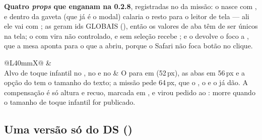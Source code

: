 \begin{atencao}
\textbf{Quatro \emph{props} que enganam na 0.2.8}, registradas no
 da missão: o  nasce  com
, e dentro da gaveta (que já é o modal) calaria o resto para o
leitor de tela --- ali ele vai com ; as  geram ids
GLOBAIS (), então os valores de aba têm de ser únicos na
tela; o  com  vira não controlado, e sem
seleção recebe ; e o  devolve o foco a
, que a mesa aponta para o  que a abriu, porque o
Safari não foca botão no clique.
\end{atencao}

\begin{tabularx}{\linewidth}{@{}L{40mm}X@{}}
\toprule
\headrow {} & \\
\midrule
Alvo de toque infantil no , no  e no  & O
   para em  (52\,px), as abas em 56\,px e a opção do
   tem o tamanho do texto; a missão pede 64\,px, que o
  , o  e o  já dão. A compensação é
  só altura e recuo, marcada  em
  , e virou pedido ao : morre
  quando o tamanho de toque infantil for publicado.\\
\bottomrule
\end{tabularx}

\subsection{Uma versão só do DS ()}
\label{sec:ds-versao-unica}

